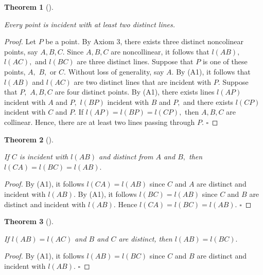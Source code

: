\documentclass[
  twoside,
  12pt,
  letterpaper,
  fleqn]{article}
\theoremstyle{definition}
\theoremstyle{definition}
\theoremstyle{plain}
\theoremstyle{plain}
\newtheorem{theorem}{Theorem}[section]
\theoremstyle{remark}
\begin{document}
\begin{theorem}[]\protect\hypertarget{thm-six}{}\label{thm-six}

Every point is incident with at least two distinct lines.

\end{theorem}

\begin{proof}

Let \(P\) be a point. By Axiom 3, there exists three distinct
noncolinear points, say \(A, B, C.\) Since \(A, B, C\) are noncollinear,
it follows that \(l(AB),\) \(l(AC),\) and \(l(BC)\) are three distinct
lines. Suppose that \(P\) is one of these points, \(A,\) \(B,\) or
\(C.\) Without loss of generality, say \(A.\) By (A1), it follows that
\(l(AB)\) and \(l(AC)\) are two distinct lines that are incident with
\(P.\) Suppose that \(P,\) \(A, B, C\) are four distinct points. By
(A1), there exists lines \(l(AP)\) incident with \(A\) and \(P,\)
\(l(BP)\) incident with \(B\) and \(P,\) and there exists \(l(CP)\)
incident with \(C\) and \(P.\) If \(l(AP)=l(BP)=l(CP),\) then
\(A, B, C\) are collinear. Hence, there are at least two lines passing
through \(P.\) \(\square\)

\end{proof}

\begin{theorem}[]\protect\hypertarget{thm-seven}{}\label{thm-seven}

If \(C\) is incident with \(l(AB)\) and distinct from \(A\) and \(B,\)
then \(l(CA)=l(BC)=l(AB).\)

\end{theorem}

\begin{proof}

By (A1), it follows \(l(CA)=l(AB)\) since \(C\) and \(A\) are distinct
and incident with \(l(AB).\) By (A1), it follows \(l(BC)=l(AB)\) since
\(C\) and \(B\) are distinct and incident with \(l(AB).\) Hence
\(l(CA)=l(BC)=l(AB).\) \(\square\)

\end{proof}

\begin{theorem}[]\protect\hypertarget{thm-eight}{}\label{thm-eight}

If \(l(AB)=l(AC)\) and \(B\) and \(C\) are distinct, then
\(l(AB)=l(BC).\)

\end{theorem}

\begin{proof}

By (A1), it follows \(l(AB)=l(BC)\) since \(C\) and \(B\) are distinct
and incident with \(l(AB).\) \(\square\)

\end{proof}
\end{document}

